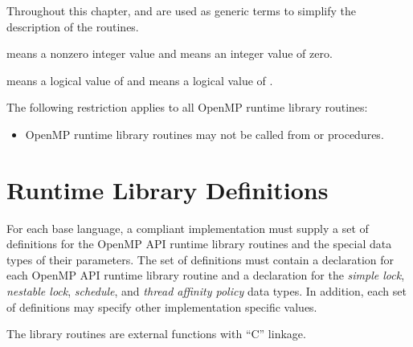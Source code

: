 Throughout this chapter,  and  are used as generic terms to simplify the 
description of the routines. 

\begin{samepage}
\ccppspecificstart
{} means a nonzero integer value and  means an integer value of zero. 
\ccppspecificend
\end{samepage}
\bigskip

\begin{samepage}
\fortranspecificstart
{} means a logical value of  and  means a logical value of .
\fortranspecificend
\end{samepage}
\bigskip

\begin{samepage}
\vspace{1\baselineskip}
\fortranspecificstart
\vspace{-1\baselineskip}
\restrictions

The following restriction applies to all OpenMP runtime library routines:

\begin{itemize}
\item OpenMP runtime library routines may not be called from  or  
procedures. 
\end{itemize}
\fortranspecificend
\end{samepage}











\section{Runtime Library Definitions}
\label{sec:runtime library definitions}
For each base language, a compliant implementation must supply a set of definitions for 
the OpenMP API runtime library routines and the special data types of their parameters. 
The set of definitions must contain a declaration for each OpenMP API runtime library 
routine and a declaration for the \emph{simple lock}, \emph{nestable lock}, \emph{schedule}, and \emph{thread affinity
policy} data types. In addition, each set of definitions may specify other implementation 
specific values.

\ccppspecificstart
The library routines are external functions with ``C'' linkage.

